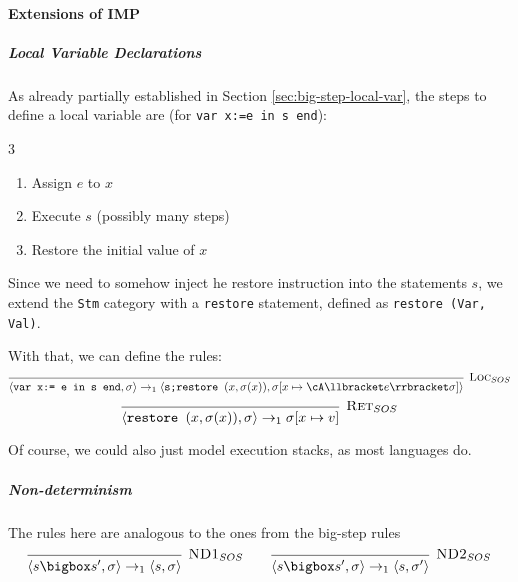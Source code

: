 \paragraph{Extensions of IMP}

\subparagraph{Local Variable Declarations}
As already partially established in Section \ref{sec:big-step-local-var}, the steps to define a local variable are (for \texttt{var x:=e in s end}):
\begin{multicols}{3}
    \begin{enumerate}
        \item Assign $e$ to $x$
        \item Execute $s$ (possibly many steps)
        \item Restore the initial value of $x$
    \end{enumerate}
\end{multicols}

Since we need to somehow inject he restore instruction into the statements $s$, we extend the \texttt{Stm} category with a \texttt{restore} statement,
defined as \texttt{restore (Var, Val)}.

With that, we can define the rules:
\[
    \begin{prooftree}
        \infer0[\textsc{Loc}$_{SOS}$]{\langle \texttt{var x:= e in s end}, \sigma \rangle \rightarrow_1 \langle \texttt{s;restore }(x, \sigma(x)),
            \sigma[x \mapsto \cA \llbracket e \rrbracket \sigma] \rangle}
    \end{prooftree}
\]
\[
    \begin{prooftree}
        \infer0[\textsc{Ret}$_{SOS}$]{\langle \texttt{restore }(x, \sigma(x)), \sigma \rangle \rightarrow_1 \sigma[x \mapsto v]}
    \end{prooftree}
\]

Of course, we could also just model execution stacks, as most languages do.


\subparagraph{Non-determinism}
The rules here are analogous to the ones from the big-step rules
\[
    \begin{prooftree}
        \infer0[\textsc{ND1}$_{SOS}$]{\langle s \bigbox s', \sigma \rangle \rightarrow_1 \langle s, \sigma \rangle}
    \end{prooftree}
    \qquad
    \begin{prooftree}
        \infer0[\textsc{ND2}$_{SOS}$]{\langle s \bigbox s', \sigma \rangle \rightarrow_1 \langle s, \sigma' \rangle}
    \end{prooftree}
\]


